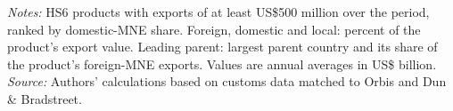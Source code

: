 \documentclass[11pt,a4paper]{article}
\begin{document}
\begin{table}[H]\centering\footnotesize%
  \caption{Products with the Highest Domestic-Multinational Share}%
  \label{tab:hs_by_domestic_share_all}%
  \par\vspace{3pt}%
  \begin{minipage}{0.95\textwidth}\footnotesize %
  \textit{Notes:} HS6 products with exports of at least US\$500 million over the period, ranked by domestic-MNE share. Foreign, domestic and local: percent of the product's export value. Leading parent: largest parent country and its share of the product's foreign-MNE exports. Values are annual averages in US\$ billion.\\[3pt]%
  \textit{Source:} Authors' calculations based on customs data matched to Orbis and Dun \& Bradstreet.%
  \end{minipage}%
  \end{table}
\end{document}

